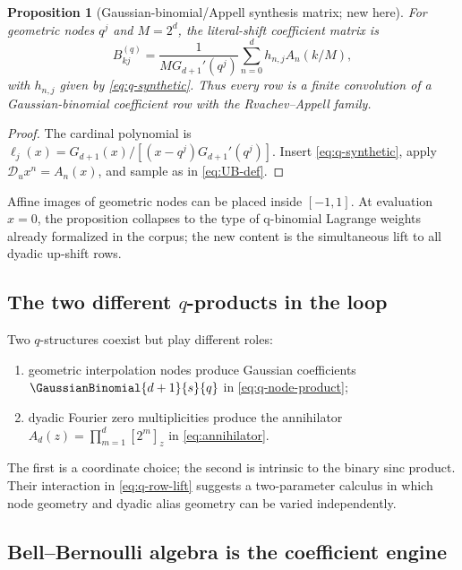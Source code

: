 \documentclass[11pt]{article}
\newtheorem{proposition}[theorem]{Proposition}
\theoremstyle{definition}
\theoremstyle{remark}
\newcommand{\Dscr}{\mathscr D_{u}}
\begin{document}
\begin{proposition}[Gaussian-binomial/Appell synthesis matrix; new here]
\label{prop:q-row-lift}
For geometric nodes $q^j$ and $M=2^d$, the literal-shift coefficient matrix is
\begin{equation}
 \boxed{
 B_{kj}^{(q)}=
 \frac{1}{M G_{d+1}'(q^j)}
 \sum_{n=0}^{d}h_{n,j}A_n(k/M),}
 \label{eq:q-row-lift}
\end{equation}
with $h_{n,j}$ given by \eqref{eq:q-synthetic}.  Thus every row is a finite
convolution of a Gaussian-binomial coefficient row with the Rvachev--Appell
family.
\end{proposition}

\begin{proof}
The cardinal polynomial is
$\ell_j(x)=G_{d+1}(x)/[(x-q^j)G_{d+1}'(q^j)]$.  Insert
\eqref{eq:q-synthetic}, apply $\Dscr x^n=A_n(x)$, and sample as in
\eqref{eq:UB-def}.
\end{proof}

Affine images of geometric nodes can be placed inside $[-1,1]$.  At evaluation
$x=0$, the proposition collapses to the type of q-binomial Lagrange weights
already formalized in the corpus; the new content is the simultaneous lift to
all dyadic up-shift rows.

\subsection{The two different \texorpdfstring{$q$}{q}-products in the loop}

Two $q$-structures coexist but play different roles:
\begin{enumerate}
  \item geometric interpolation nodes produce Gaussian coefficients
  $\GaussianBinomial{d+1}{s}{q}$ in \eqref{eq:q-node-product};
  \item dyadic Fourier zero multiplicities produce the annihilator
  $A_d(z)=\prod_{m=1}^{d}[2^m]_z$ in \eqref{eq:annihilator}.
\end{enumerate}
The first is a coordinate choice; the second is intrinsic to the binary sinc
product.  Their interaction in \eqref{eq:q-row-lift} suggests a two-parameter
calculus in which node geometry and dyadic alias geometry can be varied
independently.

\subsection{Bell--Bernoulli algebra is the coefficient engine}
\end{document}
